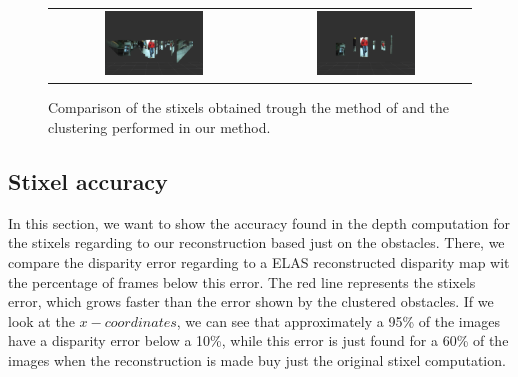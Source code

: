 \begin{figure}[h!]
\begin{tabular}{cc}
\includegraphics[width=0.49\textwidth]{stixelsDetection}\label{fig:cp04_stixels_detection} &
\includegraphics[width=0.49\textwidth]{obstacleDetection}\label{fig:cp04_obstacle_detection}
\end{tabular}
\caption{Comparison of the stixels obtained trough the method of \cite{benenson2012pedestrian} and the clustering performed in our method.}\label{fig:cp04_clustering_comparison}
\end{figure}

\subsection{Stixel accuracy}\label{ch:chapter04_02_02}

In this section, we want to show the accuracy found in the depth computation for the stixels regarding to our reconstruction based just on the obstacles. There, we compare the disparity error regarding to a \ac{ELAS} reconstructed disparity map wit the percentage of frames below this error. The red line represents the stixels error, which grows faster than the error shown by the clustered obstacles. If we look at the $x-coordinates$, we can see that approximately a 95\% of the images have a disparity error below a 10\%, while this error is just found for a 60\% of the images when the reconstruction is made buy just the original stixel computation.

